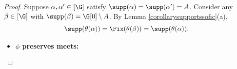 \begin{proof}
Suppose $\alpha,\alpha'\in[\G]$ satisfy $\supp(\alpha)=\supp(\alpha')=A$. Consider any $\beta\in[\G]$ with $\supp(\beta)=\G[0]\setminus A$. By Lemma \ref{corollarysupportssofic}(a),
\[\supp(\theta(\alpha))=\Fix(\theta(\beta))=\supp(\theta(\alpha)).\]
%
%
%
\begin{itemize}
\item[2.]{\bf$\phi$ preserves meets:}
\end{itemize}


\end{proof}
